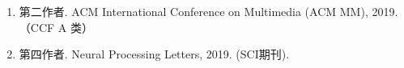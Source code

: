 \begin{publications}
\begin{enumerate}
\item{
第二作者. ACM International Conference on Multimedia (ACM MM), 2019.（CCF A 类）
}

\item{
第四作者. Neural Processing Letters, 2019. (SCI期刊). 
} 
\end{enumerate}










\end{publications}
